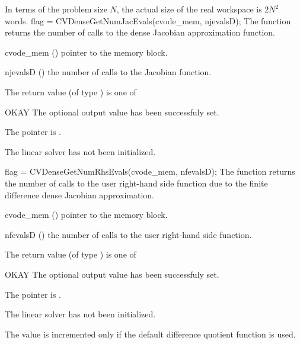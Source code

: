 {
  In terms of the problem size $N$, the actual size of the real workspace
  is $2N^2$  words.
}
{
  flag = CVDenseGetNumJacEvals(cvode\_mem, njevalsD);
}
{
  The function  returns the
  number of calls to the dense Jacobian approximation function.
}
{
  \begin{args}
  \item[cvode\_mem] ()
    pointer to the {\cvodes} memory block.
  \item[njevalsD] ()
    the number of calls to the Jacobian function.
  \end{args}
}
{
  The return value  (of type ) is one of
  \begin{args}
  \item[OKAY] 
    The optional output value has been successfuly set.
  \item[\Id{LIN\_NO\_MEM}]
    The  pointer is .
  \item[\Id{LIN\_NO\_LMEM}]
    The {\cvdense} linear solver has not been initialized.
  \end{args}
}
{}
{
  flag = CVDenseGetNumRhsEvals(cvode\_mem, nfevalsD);
}
{
  The function  returns the
  number of calls to the user right-hand side function due to the 
  finite difference dense Jacobian approximation.
}
{
  \begin{args}
  \item[cvode\_mem] ()
    pointer to the {\cvodes} memory block.
  \item[nfevalsD] ()
    the number of calls to the user right-hand side function.
  \end{args}
}
{
  The return value  (of type ) is one of
  \begin{args}
  \item[OKAY] 
    The optional output value has been successfuly set.
  \item[\Id{LIN\_NO\_MEM}]
    The  pointer is .
  \item[\Id{LIN\_NO\_LMEM}]
    The {\cvdense} linear solver has not been initialized.
  \end{args}
}
{
  The value  is incremented only if the default 
   difference quotient function is used.
}
